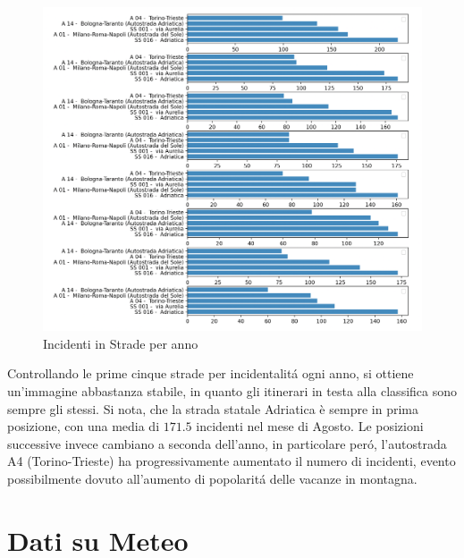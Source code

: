 \documentclass[a4paper]{report}
\begin{document}
\begin{figure}
    \includegraphics[width=\linewidth]{../src/incidenti/incidenti_aci/agosto/autostrade.png}
    \caption{Incidenti in Strade per anno}
    \label{fig:autostrade_anno}
\end{figure}

Controllando le prime cinque strade per incidentalit\'a ogni anno, si ottiene un'immagine 
abbastanza stabile, in quanto gli itinerari in testa alla classifica sono sempre gli stessi.
Si nota, che la strada statale Adriatica è sempre in prima posizione, 
con una media di $171.5$ incidenti nel mese di Agosto.
Le posizioni successive invece cambiano a seconda dell'anno, in particolare per\'o, l'autostrada 
A4 (Torino-Trieste) ha progressivamente aumentato il numero di incidenti, evento possibilmente 
dovuto all'aumento di popolarit\'a delle vacanze in montagna.


\chapter{Dati su Meteo}



\end{document}
